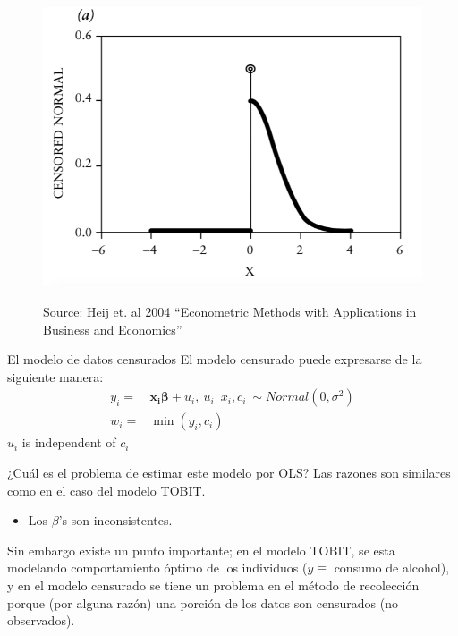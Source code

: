 \begin{frame}
	\begin{figure}[htbp]
		\hspace*{+1cm} 
		\centering
			\includegraphics[width=0.65\linewidth]{fig/censored-model} %
		\label{censored}
		\caption{Source: Heij et. al 2004 ``Econometric Methods with Applications in Business and Economics''}
	\end{figure} 
\end{frame}
\begin{frame}{El modelo de datos censurados}
	El modelo censurado puede expresarse de la siguiente manera:
		\begin{align}
			y_i=& \boldsymbol{x_i\beta}+u_i, \ u_i |  \ x_i, c_i \ \sim Normal(0,\sigma^2) \\
			w_i=&\min(y_i,c_i)
		\end{align}
	$u_i$ is independent of $c_i$
\end{frame}
\begin{frame}
	¿Cuál es el problema de estimar este modelo por OLS? Las razones son similares como en el caso del modelo TOBIT.
		\begin{itemize}
			\item Los $\beta$'s son inconsistentes.	
		\end{itemize}
	Sin embargo existe un punto importante; en el modelo TOBIT, se esta modelando comportamiento óptimo de los individuos ($y\equiv$ consumo de alcohol), y en el modelo censurado se tiene un problema en el método de recolección porque (por alguna razón) una porción de los datos son censurados (no observados).
\end{frame}
